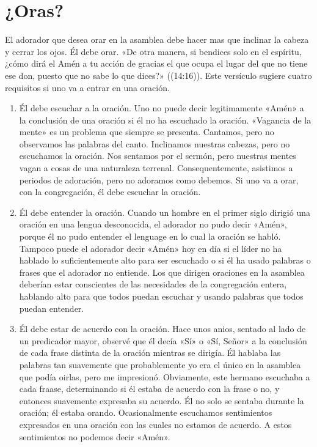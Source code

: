 \documentclass[12pt, twoside, openright]{book}
\begin{document}
\section{¿Oras?}
El adorador que desea orar en la asamblea debe hacer mas que inclinar la cabeza y cerrar los ojos. Él debe orar. «De otra manera, si bendices solo en el espíritu, ¿cómo dirá el Amén a tu acción de gracias el que ocupa el lugar del que no tiene ese don, puesto que no sabe lo que dices?» ((14:16)). Este versículo sugiere cuatro requisitos si uno va a entrar en una oración. 
\begin{enumerate}
\item Él debe escuchar a la oración. Uno no puede decir legitimamente «Amén» a la conclusión de una oración si él no ha escuchado la oración. «Vagancia de la mente» es un problema que siempre se presenta. Cantamos, pero no observamos las palabras del canto. Inclinamos nuestras cabezas, pero no escuchamos la oración. Nos sentamos por el sermón, pero nuestras mentes vagan a cosas de una naturaleza terrenal. Consequentemente, asistimos a periodos de adoración, pero no adoramos como debemos. Si uno va a orar, con la congregación, él debe escuchar la oración. 
\item Él debe entender la oración. Cuando un hombre en el primer siglo dirigió una oración en una lengua desconocida, el adorador no pudo decir «Amén», porque él no pudo entender el lenguage en lo cual la oración se habló. Tampoco puede el adorador decir «Amén» hoy en día si el líder no ha hablado lo suficientemente alto para ser escuchado o si él ha usado palabras o frases que el adorador no entiende. Los que dirigen oraciones en la asamblea deberían estar conscientes de las necesidades de la congregación entera, hablando alto para que todos puedan escuchar y usando palabras que todos puedan entender. 
\item Él debe estar de acuerdo con la oración. Hace unos anios, sentado al lado de un predicador mayor, observé que él decía «Sí» o «Sí, Señor» a la conclusión de cada frase distinta de la oración mientras se dirigía. Él hablaba las palabras tan suavemente que probablemente yo era el único en la asamblea que podía oirlas, pero me impresionó. Obviamente, este hermano escuchaba a cada fraase, determinando si él estaba de acuerdo con la frase o no, y entonces suavemente expresaba su acuerdo. Él no solo se sentaba durante la oración; él estaba orando. Ocasionalmente escuchamos sentimientos expresados en una oración con las cuales no estamos de acuerdo. A estos sentimientos no podemos decir «Amén».

\end{enumerate}
\end{document}
